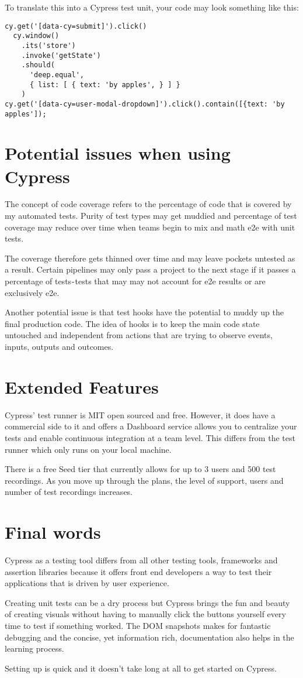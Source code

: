 To translate this into a Cypress test unit, your code may look something like this:

\begin{lstlisting}
cy.get('[data-cy=submit]').click()
  cy.window()
    .its('store')
    .invoke('getState')
    .should(
      'deep.equal',
      { list: [ { text: 'by apples', } ] }
    )
cy.get('[data-cy=user-modal-dropdown]').click().contain([{text: 'by apples']);
\end{lstlisting}

\section{ Potential issues when using Cypress }
The concept of code coverage refers to the percentage of code that is covered
by my automated tests. Purity of test types may get muddied and percentage of
test coverage may reduce over time when teams begin to mix and math e2e with
unit tests.

The coverage therefore gets thinned over time and may leave pockets untested as
a result. Certain pipelines may only pass a project to the next stage if it
passes a percentage of tests - tests that may may not account for e2e results
or are exclusively e2e.

Another potential issue is that test hooks have the potential to muddy up the
final production code. The idea of hooks is to keep the main code state
untouched and independent from actions that are trying to observe events,
inputs, outputs and outcomes.

\section{ Extended Features }
Cypress' test runner is MIT open sourced and free. However, it does have a
commercial side to it and offers a Dashboard service allows you to centralize
your tests and enable continuous integration at a team level. This differs from
the test runner which only runs on your local machine.

There is a free Seed tier that currently allows for up to 3 users and 500 test
recordings. As you move up through the plans, the level of support, users and
number of test recordings increases.

\section{ Final words }

Cypress as a testing tool differs from all other testing tools, frameworks and
assertion libraries because it offers front end developers a way to test their
applications that is driven by user experience.

Creating unit tests can be a dry process but Cypress brings the fun and beauty
of creating visuals without having to manually click the buttons yourself every
time to test if something worked. The DOM snapshots makes for fantastic
debugging and the concise, yet information rich, documentation also helps in
the learning process.

Setting up is quick and it doesn't take long at all to get started on Cypress.
